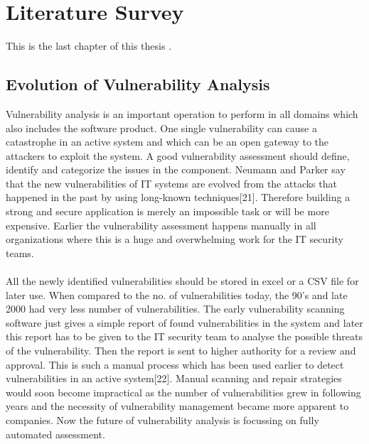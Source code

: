 %
\section{Literature Survey}\label{sec:literature survey}
%
This is the last chapter of this thesis \cite{tur38}.
%
\subsection{Evolution of Vulnerability Analysis}
Vulnerability analysis is an important operation to perform in all domains which also includes the software product. One single vulnerability can cause a catastrophe in an active system and which can be an open gateway to the attackers to exploit the system. A good vulnerability assessment should define, identify and categorize the issues in the component. 
Neumann and Parker say that the new vulnerabilities of IT systems are evolved from the attacks that happened in the past by using long-known techniques[21]. Therefore building a strong and secure application is merely an impossible task or will be more expensive. Earlier the vulnerability assessment happens manually  in all organizations where this is a huge and overwhelming work for the IT security teams. 
\paragraph{}
All the newly identified vulnerabilities should be stored in excel or a CSV file for later use. When compared to the no. of vulnerabilities today, the 90’s and late 2000 had very less number of vulnerabilities. The early vulnerability scanning software just gives a simple report of found vulnerabilities in the system and later this report has to be given to the IT security team to analyse the possible threats of the vulnerability. Then the report is sent to higher authority for a review and approval. This is such a manual process which has been used earlier to detect vulnerabilities in an active system[22]. Manual scanning and repair strategies would soon become impractical as the number of vulnerabilities grew in following years and the necessity of vulnerability management became more apparent to companies. Now the future of vulnerability analysis is focussing on fully automated assessment.
